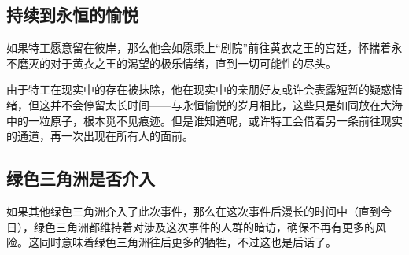 \subsection{持续到永恒的愉悦}

如果特工愿意留在彼岸，那么他会如愿乘上“剧院”前往黄衣之王的宫廷，怀揣着永不磨灭的对于黄衣之王的渴望的极乐情绪，直到一切可能性的尽头。

由于特工在现实中的存在被抹除，他在现实中的亲朋好友或许会表露短暂的疑惑情绪，但这并不会停留太长时间——与永恒愉悦的岁月相比，这些只是如同放在大海中的一粒原子，根本觅不见痕迹。但是谁知道呢，或许特工会借着另一条前往现实的通道，再一次出现在所有人的面前。

\subsection{绿色三角洲是否介入}

如果其他绿色三角洲介入了此次事件，那么在这次事件后漫长的时间中（直到今日），绿色三角洲都维持着对涉及这次事件的人群的暗访，确保不再有更多的风险。这同时意味着绿色三角洲往后更多的牺牲，不过这也是后话了。